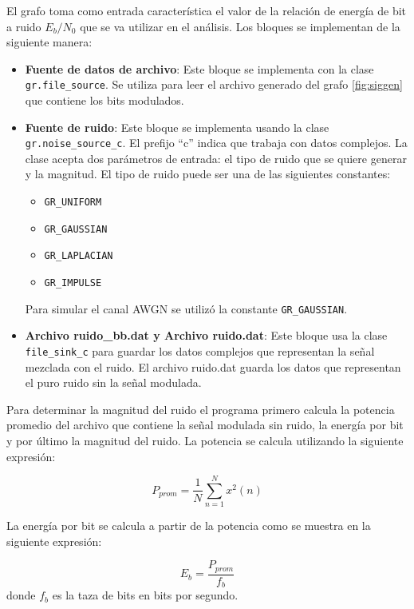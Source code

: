El grafo toma como entrada caracter\'istica el valor de la relaci\'on de energ\'ia de bit a ruido
$E_b/N_0$ que se va utilizar en el an\'alisis. Los bloques se implementan de la siguiente manera:

\begin{itemize}
  \item \textbf{Fuente de datos de archivo}: Este bloque se implementa con la clase
  \verb|gr.file_source|. Se utiliza para leer el archivo generado del grafo \ref{fig:siggen} que
  contiene los bits modulados.
  \item \textbf{Fuente de ruido}: Este bloque se implementa usando la clase \\
  \verb|gr.noise_source_c|. El prefijo ``c'' indica que trabaja con datos complejos. La clase acepta
  dos par\'ametros de entrada: el tipo de ruido que se quiere generar y la magnitud. El tipo de
  ruido puede ser una de las siguientes constantes:
  \begin{itemize}
    \item \verb|GR_UNIFORM|
    \item \verb|GR_GAUSSIAN|
    \item \verb|GR_LAPLACIAN|
    \item \verb|GR_IMPULSE| 
  \end{itemize}
  Para simular el canal AWGN se utiliz\'o la constante \verb|GR_GAUSSIAN|.
  \item \textbf{Archivo ruido\_bb.dat y Archivo ruido.dat}: Este bloque usa la clase
  \verb|file_sink_c| para guardar los datos complejos que representan la se\~nal mezclada con el
  ruido. El archivo ruido.dat guarda los datos que representan el puro ruido sin la se\~nal
  modulada.
\end{itemize}

Para determinar la magnitud del ruido el programa primero calcula la potencia promedio del archivo
que contiene la se\~nal modulada sin ruido, la energ\'ia por bit y por \'ultimo la magnitud del
ruido. La potencia se calcula utilizando la siguiente expresi\'on:

\begin{equation}\label{eq:bitpower}
P_{prom}=\frac{1}{N}\sum_{n=1}^{N}{x^2(n)}
\end{equation}

La energ\'ia por bit se calcula a partir de la potencia como se muestra en la siguiente
expresi\'on:

\begin{equation}\label{eq:bitenergy}
E_b=\frac{P_{prom}}{f_b}
\end{equation}
donde $f_b$ es la taza de bits en bits por segundo.


